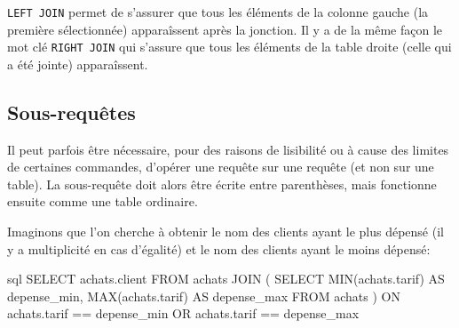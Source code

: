 \documentclass[a4paper]{scrartcl}
\begin{document}
				\rem \texttt{LEFT JOIN} permet de s'assurer que tous les éléments de la colonne gauche (la première sélectionnée) 
				apparaîssent après la jonction. Il y a de la même façon le mot clé \texttt{RIGHT JOIN} qui s'assure que
				tous les éléments de la table droite (celle qui a été jointe) apparaîssent.
		
		\subsection{Sous-requêtes}
			Il peut parfois être nécessaire, pour des raisons de lisibilité ou à cause des limites de certaines commandes, 
			d'opérer une requête sur une requête (et non sur une table). La sous-requête doit alors être écrite entre parenthèses,
			mais fonctionne ensuite comme une table ordinaire.
			
			\exemple Imaginons que l'on cherche à obtenir le nom des clients ayant le plus dépensé (il y a multiplicité en cas d'égalité)
			et le nom des clients ayant le moins dépensé:

			\begin{code}{sql}
				SELECT achats.client
				FROM achats
				JOIN
				(
					SELECT MIN(achats.tarif) AS depense_min, MAX(achats.tarif) AS depense_max
					FROM achats
				)
				ON achats.tarif == depense_min OR achats.tarif == depense_max
			\end{code}
		
\end{document}

